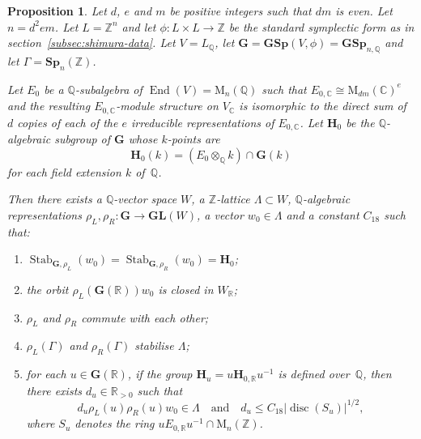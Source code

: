 \documentclass[JEP,XML,SOM,Unicode,NoFloatCountersInSection]{cedram}
\newenvironment{enumeratei}
{\bgroup\def\theenumi{\roman{enumi}}\def\theenumii{\alph{enumii}}\begin{enumerate}}
{\end{enumerate}\egroup}
\newcommand{\bC}{\mathbb{C}}
\newcommand{\bQ}{\mathbb{Q}}
\newcommand{\bR}{\mathbb{R}}
\newcommand{\bZ}{\mathbb{Z}}
\newcommand{\gG}{\mathbf{G}}
\newcommand{\gGL}{\mathbf{GL}}
\newcommand{\gGSp}{\mathbf{GSp}}
\newcommand{\gH}{\mathbf{H}}
\newcommand{\gSp}{\mathbf{Sp}}
\newcommand{\rM}{\mathrm{M}}
\DeclareMathOperator{\disc}{disc}
\DeclareMathOperator{\End}{End}
\DeclareMathOperator{\Stab}{Stab}
\newcommand{\abs}[1]{\lvert #1 \rvert}
\newtheorem{proposition}[lemma]{Proposition}
\begin{document}
\begin{proposition} \label{reps-closed-orbits}
Let $d$, $e$ and $m$ be positive integers such that $dm$ is even.
Let $n = d^2em$.
Let $L = \bZ^n$ and let $\phi \colon L \times L \to \bZ$ be the standard symplectic form as in section~\ref{subsec:shimura-data}.
Let $V = L_\bQ$, let $\gG = \gGSp(V, \phi) = \gGSp_{n,\bQ}$ and let $\Gamma = \gSp_n(\bZ)$.

Let $E_0$ be a $\bQ$-subalgebra of $\End(V) = \rM_n(\bQ)$ such that $E_{0,\bC} \cong \rM_{dm}(\bC)^e$ and the resulting $E_{0,\bC}$-module structure on $V_\bC$ is isomorphic to the direct sum of $d$ copies of each of the $e$ irreducible representations of $E_{0,\bC}$.
Let $\gH_0$ be the $\bQ$-algebraic subgroup of $\gG$ whose $k$-points are
\[
\gH_0(k) = (E_0 \otimes_\bQ k) \cap \gG(k)
\]
for each field extension $k$ of~$\bQ$.

Then there exists a $\bQ$-vector space $W$, a $\bZ$-lattice $\Lambda \subset W$, $\bQ$-algebraic representations $\rho_L, \rho_R \colon \gG \to \gGL(W)$, a vector $w_0 \in \Lambda$ and a constant $C_{18}$ such that:
\begin{enumeratei}
\item \label{reps-closed-orbitsi} $\Stab_{\gG,\rho_L}(w_0) = \Stab_{\gG,\rho_R}(w_0) = \gH_0$;

\item \label{reps-closed-orbitsii} the orbit $\rho_L(\gG(\bR))w_0$ is closed in $W_\bR$;

\item \label{reps-closed-orbitsiii} $\rho_L$ and $\rho_R$ commute with each other;

\item \label{reps-closed-orbitsiv} $\rho_L(\Gamma)$ and $\rho_R(\Gamma)$ stabilise $\Lambda$;

\item \label{reps-closed-orbitsv} for each $u \in \gG(\bR)$, if the group $\gH_u = u \gH_{0,\bR} u^{-1}$ is defined over~$\bQ$, then there exists $d_u \in \bR_{>0}$ such that
\[
d_u \rho_L(u) \rho_R(u) w_0 \in \Lambda \quad \text{and} \quad d_u \leq C_{18} \abs{\disc(S_u)}^{1/2},
\]
where $S_u$ denotes the ring $u E_{0,\bR} u^{-1} \cap \rM_n(\bZ)$.
\end{enumeratei}
\end{proposition}
\end{document}
